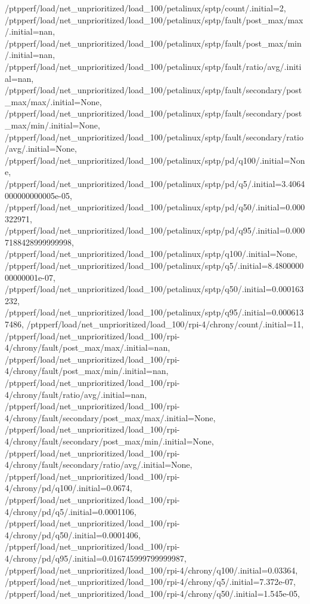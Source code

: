{    /ptpperf/load/net_unprioritized/load_100/petalinux/sptp/count/.initial=2,
    /ptpperf/load/net_unprioritized/load_100/petalinux/sptp/fault/post_max/max/.initial=nan,
    /ptpperf/load/net_unprioritized/load_100/petalinux/sptp/fault/post_max/min/.initial=nan,
    /ptpperf/load/net_unprioritized/load_100/petalinux/sptp/fault/ratio/avg/.initial=nan,
    /ptpperf/load/net_unprioritized/load_100/petalinux/sptp/fault/secondary/post_max/max/.initial=None,
    /ptpperf/load/net_unprioritized/load_100/petalinux/sptp/fault/secondary/post_max/min/.initial=None,
    /ptpperf/load/net_unprioritized/load_100/petalinux/sptp/fault/secondary/ratio/avg/.initial=None,
    /ptpperf/load/net_unprioritized/load_100/petalinux/sptp/pd/q100/.initial=None,
    /ptpperf/load/net_unprioritized/load_100/petalinux/sptp/pd/q5/.initial=3.4064000000000005e-05,
    /ptpperf/load/net_unprioritized/load_100/petalinux/sptp/pd/q50/.initial=0.000322971,
    /ptpperf/load/net_unprioritized/load_100/petalinux/sptp/pd/q95/.initial=0.0007188428999999998,
    /ptpperf/load/net_unprioritized/load_100/petalinux/sptp/q100/.initial=None,
    /ptpperf/load/net_unprioritized/load_100/petalinux/sptp/q5/.initial=8.480000000000001e-07,
    /ptpperf/load/net_unprioritized/load_100/petalinux/sptp/q50/.initial=0.000163232,
    /ptpperf/load/net_unprioritized/load_100/petalinux/sptp/q95/.initial=0.0006137486,
    /ptpperf/load/net_unprioritized/load_100/rpi-4/chrony/count/.initial=11,
    /ptpperf/load/net_unprioritized/load_100/rpi-4/chrony/fault/post_max/max/.initial=nan,
    /ptpperf/load/net_unprioritized/load_100/rpi-4/chrony/fault/post_max/min/.initial=nan,
    /ptpperf/load/net_unprioritized/load_100/rpi-4/chrony/fault/ratio/avg/.initial=nan,
    /ptpperf/load/net_unprioritized/load_100/rpi-4/chrony/fault/secondary/post_max/max/.initial=None,
    /ptpperf/load/net_unprioritized/load_100/rpi-4/chrony/fault/secondary/post_max/min/.initial=None,
    /ptpperf/load/net_unprioritized/load_100/rpi-4/chrony/fault/secondary/ratio/avg/.initial=None,
    /ptpperf/load/net_unprioritized/load_100/rpi-4/chrony/pd/q100/.initial=0.0674,
    /ptpperf/load/net_unprioritized/load_100/rpi-4/chrony/pd/q5/.initial=0.0001106,
    /ptpperf/load/net_unprioritized/load_100/rpi-4/chrony/pd/q50/.initial=0.0001406,
    /ptpperf/load/net_unprioritized/load_100/rpi-4/chrony/pd/q95/.initial=0.016745999799999987,
    /ptpperf/load/net_unprioritized/load_100/rpi-4/chrony/q100/.initial=0.03364,
    /ptpperf/load/net_unprioritized/load_100/rpi-4/chrony/q5/.initial=7.372e-07,
    /ptpperf/load/net_unprioritized/load_100/rpi-4/chrony/q50/.initial=1.545e-05,
}
